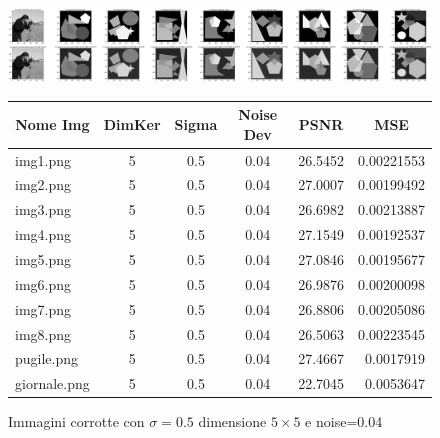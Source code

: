 \begin{figure}[H]
    \centering
    \begin{minipage}[h]{\textwidth}
    \includegraphics[width=\linewidth]{output/tabCorrotte/imgcorr2.png}\label{fig:imgcorrotte2}
    \end{minipage}
    \begin{minipage}[h]{\textwidth}
        \centering
        
        \begin{tabular}{|l c c c c r|}
            \hline
            \multicolumn{1}{|c}{\textbf{Nome Img}} & \multicolumn{1}{|c}{\textbf{DimKer}} & \multicolumn{1}{|c}{\textbf{Sigma}} & \multicolumn{1}{|c}{\textbf{Noise Dev}} & \multicolumn{1}{|c}{\textbf{PSNR}} & \multicolumn{1}{|c|}{\textbf{MSE}} \\ \hline
                img1.png & 5 & 0.5 & 0.04 & 26.5452 & 0.00221553 \\
                img2.png & 5 & 0.5 & 0.04 & 27.0007 & 0.00199492 \\
                img3.png & 5 & 0.5 & 0.04 & 26.6982 & 0.00213887 \\
                img4.png & 5 & 0.5 & 0.04 & 27.1549 & 0.00192537 \\
                img5.png & 5 & 0.5 & 0.04 & 27.0846 & 0.00195677 \\
                img6.png & 5 & 0.5 & 0.04 & 26.9876 & 0.00200098 \\
                img7.png & 5 & 0.5 & 0.04 & 26.8806 & 0.00205086 \\
                img8.png & 5 & 0.5 & 0.04 & 26.5063 & 0.00223545 \\
                pugile.png & 5 & 0.5 & 0.04 & 27.4667 & 0.0017919\\
                giornale.png & 5 & 0.5 & 0.04 & 22.7045 & 0.0053647 \\ \hline
            \end{tabular}\label{tab:tabcorrotte2}
        
        \end{minipage}
    \captionsetup{labelformat=andtable}
    \caption{Immagini corrotte con $\sigma = 0.5$ dimensione $5 \times 5$ e noise=0.04}
\end{figure}

